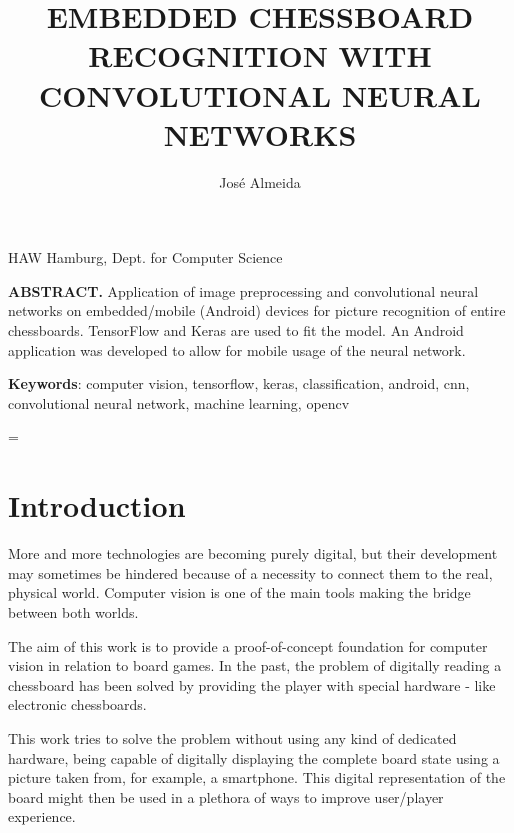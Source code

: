 \documentclass[10pt]{article}
\title{\renewcommand{\baselinestretch}{1.17}\normalsize\bf%
\uppercase{Embedded Chessboard Recognition with Convolutional Neural Networks}
}
\author{%
José Almeida
}
\begin{document}
\date{}

\maketitle

\vspace{-0.5cm}

\begin{center}
{\footnotesize 
HAW Hamburg, Dept. for Computer Science \\
}
\end{center}

\bigskip
\noindent
{\small{\bf ABSTRACT.}
Application of image preprocessing and convolutional neural networks on embedded/mobile (Android) devices for picture recognition of entire chessboards. TensorFlow and Keras are used to fit the model. An Android application was developed to allow for mobile usage of the neural network.
}

\medskip
\noindent
{\small{\bf Keywords}{:} 
computer vision, tensorflow, keras, classification, android, cnn, convolutional neural network, machine learning, opencv
}

\baselineskip=\normalbaselineskip

\section{Introduction}\label{sec:1}

More and more technologies are becoming purely digital, but their development may sometimes be hindered because of a necessity to connect them to the real, physical world. Computer vision is one of the main tools making the bridge between both worlds.

The aim of this work is to provide a proof-of-concept foundation for computer vision in relation to board games. In the past, the problem of digitally reading a chessboard has been solved by providing the player with special hardware - like electronic chessboards.

This work tries to solve the problem without using any kind of dedicated hardware, being capable of digitally displaying the complete board state using a picture taken from, for example, a smartphone. This digital representation of the board might then be used in a plethora of ways to improve user/player experience.
\end{document}

